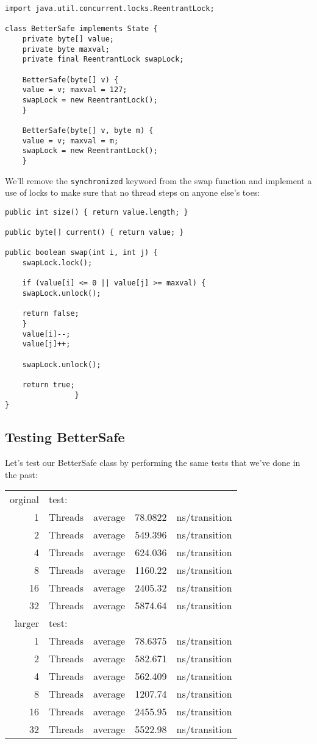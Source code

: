 \documentclass[11pt]{article}
\begin{document}
\begin{verbatim}
import java.util.concurrent.locks.ReentrantLock;

class BetterSafe implements State {
    private byte[] value;
    private byte maxval;
    private final ReentrantLock swapLock;

    BetterSafe(byte[] v) {
	value = v; maxval = 127;
	swapLock = new ReentrantLock();
    }

    BetterSafe(byte[] v, byte m) {
	value = v; maxval = m;
	swapLock = new ReentrantLock();
    }
\end{verbatim}

We'll remove the \verb~synchronized~ keyword from the swap
function and implement a use of locks to make sure that
no thread steps on anyone else's toes: 

\begin{verbatim}
public int size() { return value.length; }

public byte[] current() { return value; }

public boolean swap(int i, int j) {
    swapLock.lock();

    if (value[i] <= 0 || value[j] >= maxval) {
	swapLock.unlock();

	return false;
    }
    value[i]--;
    value[j]++;

    swapLock.unlock();

    return true;
			    }
}
\end{verbatim}
\subsection{Testing BetterSafe}
\label{sec-6-2}
Let's test our BetterSafe class by performing the same tests
that we've done in the past:

\begin{center}
\begin{tabular}{rllrl}
orginal & test: &  &  & \\
1 & Threads & average & 78.0822 & ns/transition\\
2 & Threads & average & 549.396 & ns/transition\\
4 & Threads & average & 624.036 & ns/transition\\
8 & Threads & average & 1160.22 & ns/transition\\
16 & Threads & average & 2405.32 & ns/transition\\
32 & Threads & average & 5874.64 & ns/transition\\
larger & test: &  &  & \\
1 & Threads & average & 78.6375 & ns/transition\\
2 & Threads & average & 582.671 & ns/transition\\
4 & Threads & average & 562.409 & ns/transition\\
8 & Threads & average & 1207.74 & ns/transition\\
16 & Threads & average & 2455.95 & ns/transition\\
32 & Threads & average & 5522.98 & ns/transition\\
\end{tabular}
\end{center}
\end{document}
